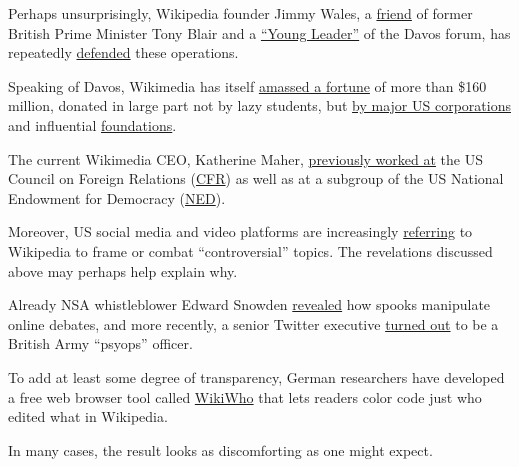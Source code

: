 Perhaps unsurprisingly, Wikipedia founder Jimmy Wales, a
\href{http://wikipediocracy.com/2015/06/01/how-jimmy-wales-rode-tony-blairs-coattails/}{friend}
of former British Prime Minister Tony Blair and a
\href{http://reports.weforum.org/the-forum-of-young-global-leaders-2014/ygl-stories/crowdsourced/}{``Young
Leader''} of the Davos forum, has repeatedly
\href{https://gosint.wordpress.com/2018/06/02/wikipedia-the-spooks-the-remake-update-philip-cross-identified/}{defended}
these operations.

Speaking of Davos, Wikimedia has itself
\href{https://en.wikipedia.org/wiki/Wikimedia_Foundation}{amassed a
fortune} of more than \$160 million, donated in large part not by lazy
students, but
\href{https://wikimediafoundation.org/support/benefactors/}{by major US
corporations} and influential
\href{https://www.dailydot.com/business/wikipedia-conflict-editing-donation-benefactors/}{foundations}.

The current Wikimedia CEO, Katherine Maher,
\href{https://thegrayzone.com/2020/06/11/meet-wikipedias-ayn-rand-loving-founder-and-wikimedia-foundations-regime-change-operative-ceo/}{previously
worked at} the US Council on Foreign Relations
(\href{https://swprs.org/the-american-empire-and-its-media/}{CFR}) as
well as at a subgroup of the US National Endowment for Democracy
(\href{https://swprs.org/organizations-funded-by-the-ned/}{NED}).

Moreover, US social media and video platforms are increasingly
\href{https://www.theguardian.com/technology/2018/mar/13/youtube-wikipedia-flag-conspiracy-theory-videos}{referring}
to Wikipedia to frame or combat ``controversial'' topics. The
revelations discussed above may perhaps help explain why.

Already NSA whistleblower Edward Snowden
\href{https://www.theguardian.com/uk-news/2014/jul/14/gchq-tools-manipulate-online-information-leak}{revealed}
how spooks manipulate online debates, and more recently, a senior
Twitter executive
\href{https://www.middleeasteye.net/news/twitter-executive-also-part-time-officer-uk-army-psychological-warfare-unit}{turned
out} to be a British Army ``psyops'' officer.

To add at least some degree of transparency, German researchers have
developed a free web browser tool called
\href{https://f-squared.org/whovisual/}{WikiWho} that lets readers color
code just who edited what in Wikipedia.

In many cases, the result looks as discomforting as one might expect.

